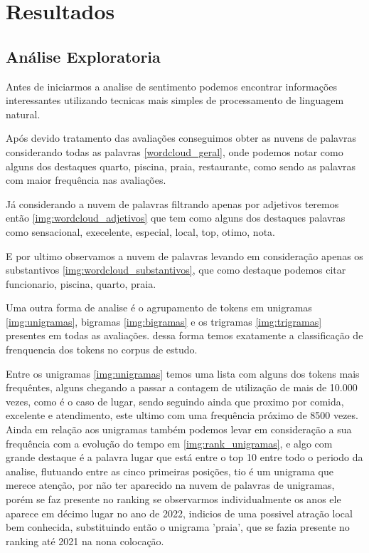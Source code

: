 \chapter{Resultados}
\label{cap:resultados}


\section{Análise Exploratoria}
\label{cap:resultados:sec:analise_exploratoria}

Antes de iniciarmos a analise de sentimento podemos encontrar informações interessantes utilizando tecnicas mais simples de processamento de linguagem natural.

Após devido tratamento das avaliações conseguimos obter as nuvens de palavras considerando todas as palavras \ref{wordcloud_geral}, onde podemos notar como alguns dos destaques quarto, piscina, praia, restaurante, como sendo as palavras com maior frequência nas avaliações.


Já considerando a nuvem de palavras filtrando apenas por adjetivos teremos então \ref{img:wordcloud_adjetivos} que tem como alguns dos destaques palavras como sensacional, execelente, especial, local, top, otimo, nota.

E por ultimo observamos a nuvem de palavras levando em consideração apenas os substantivos \ref{img:wordcloud_substantivos}, que como destaque podemos citar funcionario, piscina, quarto, praia.

Uma outra forma de analise é o agrupamento de tokens em unigramas \ref{img:unigramas}, bigramas \ref{img:bigramas} e os trigramas \ref{img:trigramas} presentes em todas as avaliações. dessa forma temos exatamente a classificação de frenquencia dos tokens no corpus de estudo.

Entre os unigramas \ref{img:unigramas} temos uma lista com alguns dos tokens mais frequêntes, alguns chegando a passar a contagem de utilização de mais de 10.000 vezes, como é o caso de lugar, sendo seguindo ainda que proximo por comida, excelente e atendimento, este ultimo com uma frequência próximo de 8500 vezes. Ainda em relação aos unigramas também podemos levar em consideração a sua frequência com a evolução do tempo em \ref{img:rank_unigramas}, e algo com grande destaque é a palavra lugar que está entre o top 10 entre todo o periodo da analise, flutuando entre as cinco primeiras posições, tio é um unigrama que merece atenção, por não ter aparecido na nuvem de palavras de unigramas, porém se faz presente no ranking se observarmos individualmente os anos ele aparece em décimo lugar no ano de 2022, indicios de uma possivel atração local bem conhecida, substituindo então o unigrama 'praia', que se fazia presente no ranking até 2021 na nona colocação.

